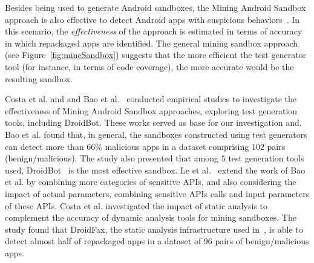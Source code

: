 Besides being used to generate Android sandboxes, the Mining Android Sandbox approach is also effective 
to detect Android apps with suspicious behaviors~\cite{DBLP:conf/wcre/BaoLL18}.  In this scenario, the \emph{effectiveness} of the approach
is estimated in terms of accuracy in which repackaged apps are identified.
The general mining sandbox approach (see Figure~\ref{fig:mineSandbox}) suggests
that the more efficient the test generator tool (for instance, in terms of code coverage),
the more accurate would be the resulting sandbox.





Costa et al. and and Bao et al.~\cite{DBLP:conf/wcre/BaoLL18,DBLP:conf/scam/CostaMCMVBC20} conducted empirical studies to investigate the effectiveness of Mining Android Sandbox
approaches, exploring test generation tools, including DroidBot. These works served as base for our investigation and. Bao et al. found that, in general, the sandboxes constructed using test generators can detect more than $66$\% malicious apps in a dataset comprising $102$ pairs (benign/malicious). The study also presented that among $5$ test generation tools used, DroidBot~\cite{DBLP:conf/icse/LiYGC17} is the most effective sandbox.
Le et al.~\cite{le2018towards} extend the work of Bao et al. by combining more categories of sensitive APIs, and also considering the impact of actual parameters, combining sensitive APIs calls and input parameters of these APIs.
Costa et al.\cite{DBLP:journals/jss/CostaMMSSBNR22} investigated the impact of static analysis to complement the accuracy of dynamic analysis tools for mining sandboxes. The study found that DroidFax, the static analysis infrastructure used in~\cite{DBLP:conf/wcre/BaoLL18}, is able to detect almost half of repackaged apps in a
dataset of $96$ pairs of benign/malicious apps.

